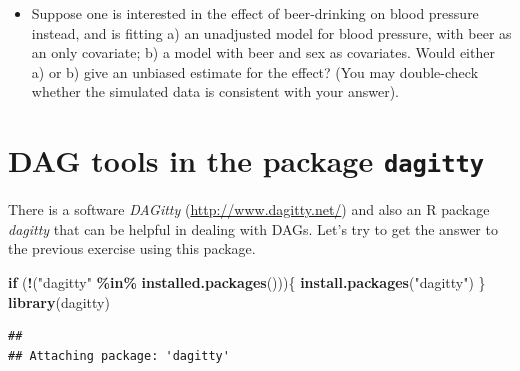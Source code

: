 \documentclass[
]{book}
\newenvironment{Shaded}{\begin{snugshade}}{\end{snugshade}}
\newcommand{\ControlFlowTok}[1]{\textcolor[rgb]{0.13,0.29,0.53}{\textbf{#1}}}
\newcommand{\DecValTok}[1]{\textcolor[rgb]{0.00,0.00,0.81}{#1}}
\newcommand{\FunctionTok}[1]{\textcolor[rgb]{0.13,0.29,0.53}{\textbf{#1}}}
\newcommand{\NormalTok}[1]{#1}
\newcommand{\OtherTok}[1]{\textcolor[rgb]{0.56,0.35,0.01}{#1}}
\newcommand{\SpecialCharTok}[1]{\textcolor[rgb]{0.81,0.36,0.00}{\textbf{#1}}}
\newcommand{\StringTok}[1]{\textcolor[rgb]{0.31,0.60,0.02}{#1}}
\providecommand{\tightlist}{%
  \setlength{\itemsep}{0pt}\setlength{\parskip}{0pt}}
\begin{document}
\begin{Shaded}
\end{Shaded}

\begin{itemize}
\tightlist
\item
  Suppose one is interested in the effect of beer-drinking on blood pressure instead, and is fitting a) an unadjusted model for blood pressure, with beer as an only covariate; b) a model with beer and sex as covariates. Would either a) or b) give an unbiased estimate for the effect? (You may double-check whether the simulated data is consistent with your answer).
\end{itemize}

\section{\texorpdfstring{DAG tools in the package \texttt{dagitty}}{DAG tools in the package dagitty}}\label{dag-tools-in-the-package-dagitty}

There is a software \emph{DAGitty} (\url{http://www.dagitty.net/}) and also an R package \emph{dagitty} that can be helpful in dealing with DAGs. Let's try to get the answer to the previous exercise using this package.

\begin{Shaded}
\begin{Highlighting}[]
\ControlFlowTok{if}\NormalTok{ (}\SpecialCharTok{!}\NormalTok{(}\StringTok{"dagitty"} \SpecialCharTok{\%in\%} \FunctionTok{installed.packages}\NormalTok{()))\{}
  \FunctionTok{install.packages}\NormalTok{(}\StringTok{"dagitty"}\NormalTok{)}
\NormalTok{\}}
\FunctionTok{library}\NormalTok{(dagitty)}
\end{Highlighting}
\end{Shaded}

\begin{verbatim}
## 
## Attaching package: 'dagitty'
\end{verbatim}
\end{document}
